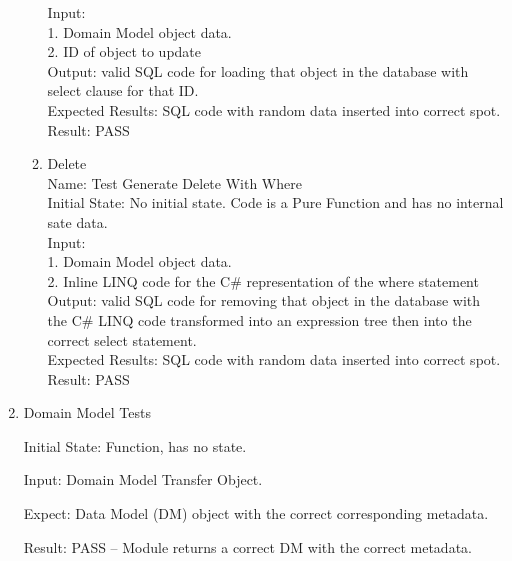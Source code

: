\documentclass[12pt, titlepage]{article}
\begin{document}
\begin{enumerate}
\begin{enumerate}
				Input:\\
				1. Domain Model object data.\\
				2. ID of object to update\\

				Output: valid SQL code for loading that object in the database with
				select clause for that ID.\\

				Expected Results: SQL code with random data inserted into correct spot.\\

				Result: PASS

				\item Delete\\

				Name: Test Generate Delete With Where\\

				Initial State: No initial state. Code is a Pure Function and has no internal sate data.\\

				Input:\\
				1. Domain Model object data.\\
				2. Inline LINQ code for the C\# representation of the where statement\\

				Output: valid SQL code for removing that object in the database with
				the C\# LINQ code transformed into an expression tree then into the correct
				select statement.\\

				Expected Results: SQL code with random data inserted into correct spot.\\

				Result: PASS\\

			\end{enumerate}


      \item{Domain Model Tests\\} \label{dto}

      Initial State: Function, has no state.

      Input: Domain Model Transfer Object.

			Expect: Data Model (DM) object with the correct corresponding metadata.

			Result: PASS -- Module returns a correct DM with the correct metadata.

    \end{enumerate}
\end{document}
